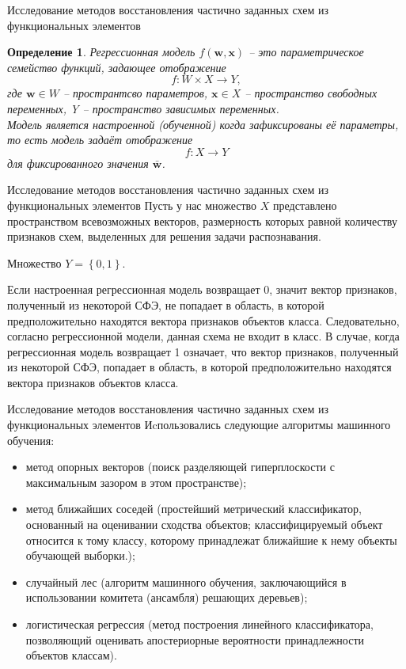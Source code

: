 \documentclass[serif,utf8]{beamer}
\newtheorem{mydef}{Определение}
\begin{document}
\begin{frame}{Исследование методов восстановления частично заданных схем из функциональных элементов}
\begin{mydef}
Регрессионная модель $f(\mathbf{w},\mathbf{x})$ -- это параметрическое семейство функций, задающее отображение
\begin{equation}
f: W \times X \longrightarrow Y,
\end{equation}
где $\mathbf{w} \in W$ -- пространтсво параметров, $\mathbf{x} \in X$ -- пространство свободных переменных, Y -- пространство зависимых переменных.\\
Модель является настроенной (обученной) когда зафиксированы её параметры, то есть модель задаёт отображение
\begin{equation}
f:X \longrightarrow Y
\end{equation}
для фиксированного значения $\bar{\mathbf{w}}$.
\end{mydef}
\end{frame}


\begin{frame}{Исследование методов восстановления частично заданных схем из функциональных элементов}
Пусть у нас множество $X$ представлено пространством всевозможных векторов,  размерность которых равной количеству признаков схем, выделенных для решения задачи распознавания.\par
Множество $Y = \left\{ 0, 1 \right\}$.\par
Если настроенная регрессионная модель возвращает 0, значит вектор признаков, полученный из некоторой СФЭ, не попадает в область, в которой предположительно находятся вектора признаков объектов класса. Следовательно, согласно регрессионной модели, данная схема не входит в класс. В случае, когда регрессионная модель возвращает 1 означает, что вектор признаков, полученный из некоторой СФЭ, попадает в область, в которой предположительно находятся вектора признаков объектов класса.\par
\end{frame}

\begin{frame}{Исследование методов восстановления частично заданных схем из функциональных элементов} 
Иcпользовались следующие алгоритмы машинного обучения:
\small{\begin{itemize}
\item метод опорных векторов (поиск разделяющей гиперплоскости с максимальным зазором в этом пространстве);
\item метод ближайших соседей (простейший метрический классификатор, основанный на оценивании сходства объектов; классифицируемый объект относится к тому классу, которому принадлежат ближайшие к нему объекты обучающей выборки.);
\item случайный лес (алгоритм машинного обучения, заключающийся в использовании комитета (ансамбля) решающих деревьев);
\item логистическая регрессия (метод построения линейного классификатора, позволяющий оценивать апостериорные вероятности принадлежности объектов классам).
\end{itemize}
}
\end{frame}
\end{document}
